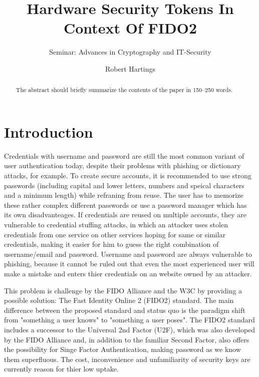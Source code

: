 \documentclass[runningheads]{llncs}
\begin{document}
%
\title{Hardware Security Tokens In Context Of FIDO2}
\subtitle{Seminar: Advances in Cryptography and IT-Security}
%
%

\author{Robert Hartings}

%
\maketitle              %
%
\begin{abstract}
The abstract should briefly summarize the contents of the paper in
150--250 words.

\end{abstract}
%
%
%
\section{Introduction}
Credentials with username and password are still the most common variant of user authentication today, despite their problems with phishing or dictionary attacks, for example. To create secure accounts, it is recommended to use strong passwords (including capital and lower letters, numbers and speical characters and a minimum length) while refraning from reuse. The user has to memorize these rather complex different passwords or use a password manager which has its own disadvanteages. If credentials are reused on multiple accounts, they are vulnerable to credential stuffing attacks, in which an attacker uses stolen credentials from one service on other services hoping for same or similar credentials, making it easier for him to guess the right combination of username/email and password. Username and password are always vulnerable to phishing, because it cannot be ruled out that even the most experienced user will make a mistake and enters thier credentials on an website owned by an attacker.

This problem is challenge by the FIDO Alliance and the W3C by providing a possible solution: The Fast Identity Online 2 (FIDO2) standard. The main difference between the proposed standard and status quo is the paradigm shift from "something a user knows" to "something a user poses". The FIDO2 standard includes a successor to the Universal 2nd Factor (U2F), which was also developed by the FIDO Alliance and, in addition to the familiar Second Factor, also offers the possibility for Singe Factor Authentication, making password as we know them superfluous. The cost, inconvenience and unfamiliarity of security keys are currently reason for thier low uptake.\cite{274547}\cite{9152694}
\end{document}
